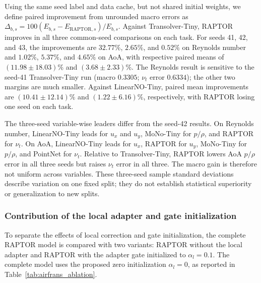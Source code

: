 \documentclass[a4paper,fleqn]{cas-sc}
\begin{document}
Using the same seed label and data cache, but not shared initial weights,
we define paired improvement from unrounded macro errors as
\(\Delta_{b,s}=100(E_{b,s}-E_{\mathrm{RAPTOR},s})/E_{b,s}\).
Against Transolver-Tiny, RAPTOR improves in all three common-seed
comparisons on each task. For seeds 41, 42, and 43, the improvements
are \(32.77\%\), \(2.65\%\), and \(0.52\%\) on Reynolds number
and \(1.02\%\), \(5.37\%\), and \(4.65\%\) on AoA, with respective
paired means of \((11.98\pm18.03)\%\) and \((3.68\pm2.33)\%\).
The Reynolds result is sensitive to the seed-41 Transolver-Tiny run
(macro \(0.3305\); \(\nu_t\) error \(0.6334\)); the other two margins
are much smaller. Against LinearNO-Tiny, paired mean improvements
are \((10.41\pm12.14)\%\) and \((1.22\pm6.16)\%\), respectively,
with RAPTOR losing one seed on each task.

The three-seed variable-wise leaders differ from the seed-42 results.
On Reynolds number, LinearNO-Tiny leads for \(u_x\) and \(u_y\),
MoNo-Tiny for \(p/\rho\), and RAPTOR for \(\nu_t\). On AoA,
LinearNO-Tiny leads for \(u_x\), RAPTOR for \(u_y\), MoNo-Tiny for
\(p/\rho\), and PointNet for \(\nu_t\). Relative to Transolver-Tiny,
RAPTOR lowers AoA \(p/\rho\) error in all three seeds but raises
\(\nu_t\) error in all three. The macro gain is therefore not
uniform across variables. These three-seed sample standard deviations
describe variation on one fixed split; they do not establish
statistical superiority or generalization to new splits.

\subsubsection{Contribution of the local adapter and gate initialization}
\label{subsec:ablation_results}

To separate the effects of local correction and gate initialization, the
complete RAPTOR model is compared with two variants: RAPTOR without the
local adapter and RAPTOR with the adapter gate initialized to
\(\alpha_l=0.1\). The complete model uses the proposed zero initialization
\(\alpha_l=0\), as reported in Table~\ref{tab:airfrans_ablation}.
\end{document}
